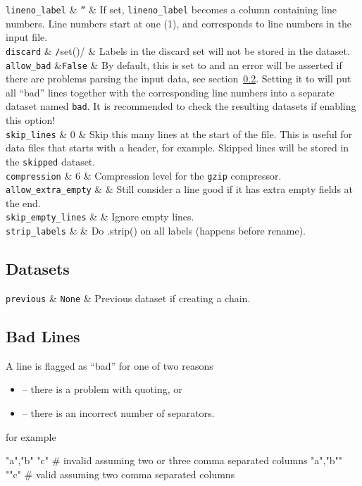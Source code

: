 \RP \texttt{lineno\_label} & \texttt{''} & If set,
\texttt{lineno\_label} becomes a column containing line numbers.
Line numbers start at one (1), and corresponds to line numbers in the
input file.  \\

\RP \texttt{discard} & \texttt/set()/ & Labels in the
discard set will not be stored in the dataset.\\

\RP \texttt{allow\_bad} &\texttt{False} & By default, this is
set to \pyFalse and an error will be asserted if there are problems
parsing the input data, see section~\ref{sec:csvimport-bad}.  Setting it
to \pyTrue will put all ``bad'' lines together with the corresponding
line numbers into a separate dataset named \texttt{bad}.  It is
recommended to check the resulting datasets if enabling this
option!\\

\RP \texttt{skip\_lines} & 0 & Skip this many lines at the start of the file.
This is useful for data files that starts with a header, for
example.  Skipped lines will be stored in the \texttt{skipped} dataset.\\

\RP \texttt{compression} & 6 & Compression level for the \texttt{gzip} compressor.\\

\RP \texttt{allow\_extra\_empty} & \pyFalse & Still consider a line good if it has extra empty fields at the end.\\

\RP \texttt{skip\_empty\_lines} & \pyFalse & Ignore empty lines.\\

\RP \texttt{strip\_labels} & \pyFalse & Do .strip() on all labels (happens before rename).\\

\stoptable


\subsection{Datasets}
\starttable
  \RP \texttt{previous} & \texttt{None} & Previous dataset if creating a
  chain.\\
\stoptable


\subsection{Bad Lines}
\label{sec:csvimport-bad}
A line is flagged as ``bad'' for one of two reasons
\begin{itemize}
\item[] -- there is a problem with quoting, or
\item[] -- there is an incorrect number of separators.
\end{itemize}
for example
\begin{python}
  "a","b" "c"     # invalid assuming two or three comma separated columns
  "a","b"" ""c"   # valid assuming two comma separated columns
\end{python}


